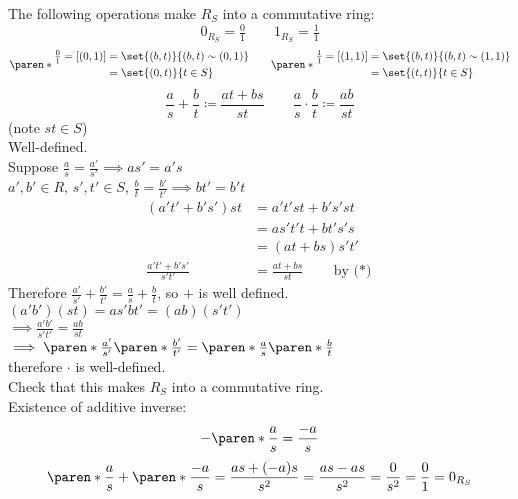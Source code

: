 \prop The following operations make $R_S$ into a commutative ring:
\[ 0_{R_S} = \tfrac{0}{1} \qquad 1_{R_S} = \tfrac{1}{1} \]
\[ \paren*{\begin{aligned}
\tfrac{0}{1} = [(0,1)] &= \set{(b,t)}{(b,t)\sim(0,1)} \\
&= \set{(0,t)}{t\in S}
\end{aligned}}
\qquad
\paren*{\begin{aligned}
\tfrac{1}{1} = [(1,1)] &= \set{(b,t)}{(b,t)\sim(1,1)} \\
&= \set{(t,t)}{t\in S}
\end{aligned}} \]
\[ \frac{a}{s} + \frac{b}{t} \coloneqq \frac{at+bs}{st} \qquad \frac{a}{s}\cdot\frac{b}{t} \coloneqq \frac{ab}{st} \]
(note $st\in S$) \\
\pf Well-defined. \\
Suppose $\frac{a}{s}=\frac{a'}{s'}\implies as'=a's$ \\
$a',b'\in R$, $s',t'\in S$, $\frac{b}{t}=\frac{b'}{t'}\implies bt'=b't$
\begin{align*}
(a't'+b's')st &= a't'st + b's'st \\
&= as't't + bt's's \\
&= (at+bs)s't' \\
\frac{a't'+b's'}{s't'} &= \frac{at+bs}{st} \qquad\text{by ($*$)}
\end{align*}
Therefore $\frac{a'}{s'}+\frac{b'}{t'}=\frac{a}{s}+\frac{b}{t}$, so $+$ is well defined. \\
$(a'b')(st)=as'bt'=(ab)(s't')$ \\
$\implies \frac{a'b'}{s't'} = \frac{ab}{st}$ \\
$\implies \paren*{\frac{a'}{s'}}\paren*{\frac{b'}{t'}} = \paren*{\frac{a}{s}}\paren*{\frac{b}{t}}$ \\
therefore $\cdot$ is well-defined. \\
Check that this makes $R_S$ into a commutative ring. \\
\ex Existence of additive inverse:
\[ -\paren*{\frac{a}{s}} = \frac{-a}{s} \]
\pf
\[ \paren*{\frac{a}{s}} + \paren*{\frac{-a}{s}} = \frac{as+(-a)s}{s^2} = \frac{as-as}{s^2} = \frac{0}{s^2} = \frac{0}{1} = 0_{R_S} \]

